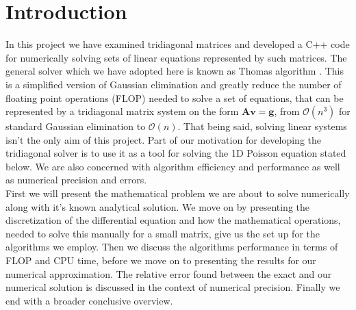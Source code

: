 \documentclass[12pt]{article}
\numberwithin{figure}{section}
\numberwithin{table}{section}
\begin{document}

\section{Introduction}
In this project we have examined tridiagonal matrices and developed a C++ code for numerically solving sets of linear equations represented by such matrices. The general solver which we have adopted here is known as Thomas algorithm \cite{ThomasAlg}. This is a simplified version of Gaussian elimination and greatly reduce the number of floating point operations (FLOP) needed to solve a set of equations, that can be represented by a tridiagonal matrix system on the form $\mathbf{A}\mathbf{v} = \mathbf{g}$, from  $\mathcal{O}(n^3)$ for standard Gaussian elimination to $\mathcal{O}(n)$. That being said, solving linear systems isn't the only aim of this project. Part of our motivation for developing the tridiagonal solver is to use it as a tool for solving the 1D Poisson equation stated below. We are also concerned with algorithm efficiency and performance as well as numerical precision and errors.\\

\noindent First we will present the mathematical problem we are about to solve numerically along with it's known analytical solution. We move on by presenting the discretization of the differential equation and how the mathematical operations, needed to solve this manually for a small matrix, give us the set up for the algorithms we employ. Then we discuss the algorithms performance in terms of FLOP and CPU time, before we move on to presenting the results for our numerical approximation. The relative error found between the exact and our numerical solution is discussed in the context of numerical precision. Finally we end with a broader conclusive overview. 				\\
\end{document}
